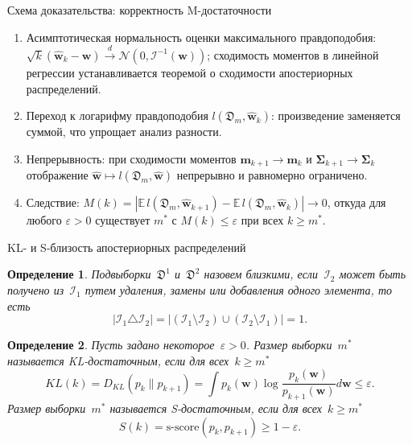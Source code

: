 \documentclass[10pt,pdf,hyperref={unicode}]{beamer}
\newtheorem{rusdefinition}{Определение}
\begin{document}
\begin{frame}{Схема доказательства: корректность M-достаточности}
\justifying
\small
\begin{enumerate}
    \item Асимптотическая нормальность оценки максимального правдоподобия: $\sqrt{k}(\hat{\mathbf{w}}_k-\mathbf{w})\xrightarrow{d}\mathcal{N}\left(0,\mathcal{I}^{-1}(\mathbf{w})\right)$; сходимость моментов в линейной регрессии устанавливается теоремой о сходимости апостериорных распределений.
    \item Переход к логарифму правдоподобия $l(\mathfrak{D}_m,\hat{\mathbf{w}}_k)$: произведение заменяется суммой, что упрощает анализ разности.
    \item Непрерывность: при сходимости моментов $\mathbf{m}_{k+1}\to\mathbf{m}_k$ и $\bm{\Sigma}_{k+1}\to\bm{\Sigma}_k$ отображение $\hat{\mathbf{w}}\mapsto l(\mathfrak{D}_m,\hat{\mathbf{w}})$ непрерывно и равномерно ограничено.
    \item Следствие: $M(k) = \left|\mathbb{E}\,l(\mathfrak{D}_m,\hat{\mathbf{w}}_{k+1})-\mathbb{E}\,l(\mathfrak{D}_m,\hat{\mathbf{w}}_k)\right|\to 0$, откуда для любого $\varepsilon>0$ существует $m^*$ с $M(k)\leqslant\varepsilon$ при всех $k\geqslant m^*$.
\end{enumerate}
\end{frame}
\begin{frame}{KL- и S-близость апостериорных распределений}
\justifying
\small
\begin{rusdefinition}
    \justifying
    Подвыборки~$\mathfrak{D}^1$ и~$\mathfrak{D}^2$ назовем близкими, если~$\mathcal{I}_2$ может быть получено из~$\mathcal{I}_1$ путем удаления, замены или добавления одного элемента, то есть
    \[
        \left| \mathcal{I}_1 \triangle \mathcal{I}_2 \right| = \left| \left( \mathcal{I}_1 \setminus \mathcal{I}_2 \right) \cup \left( \mathcal{I}_2 \setminus \mathcal{I}_1 \right) \right| = 1.
    \]
\end{rusdefinition}

\begin{rusdefinition}
    \justifying
    Пусть задано некоторое~$\varepsilon > 0$.
    Размер выборки~$m^*$ называется KL-достаточным, если для всех~$k\geqslant m^*$
    \[
        KL(k) = D_{KL}(p_k \| p_{k+1}) = \int p_k(\mathbf{w}) \log{\frac{p_k(\mathbf{w})}{p_{k+1}(\mathbf{w})}} d\mathbf{w} \leqslant \varepsilon.
    \]
    Размер выборки~$m^*$ называется S-достаточным, если для всех~$k\geqslant m^*$
    \[
        S(k) = \text{s-score}(p_k, p_{k+1}) \geqslant 1-\varepsilon.
    \]
\end{rusdefinition}
\end{frame}
\end{document}
